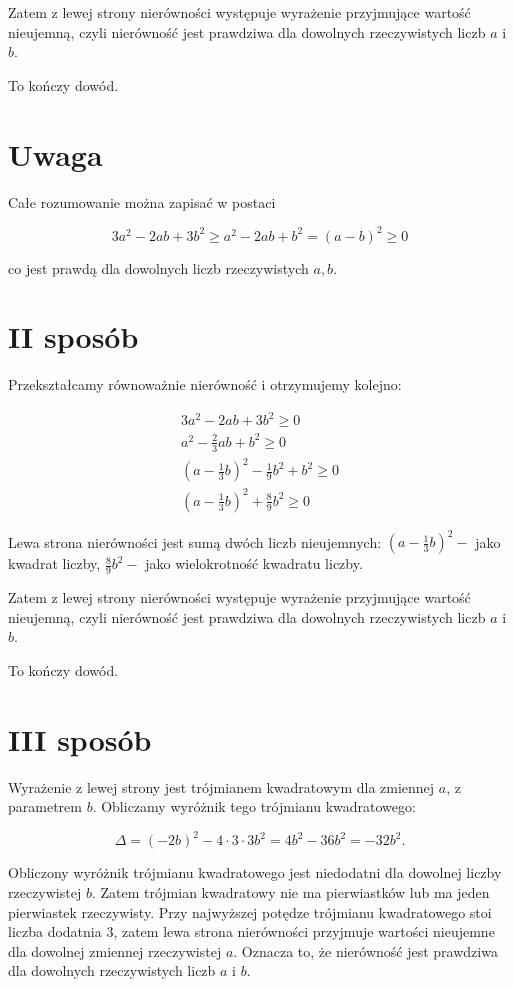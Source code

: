 \documentclass[10pt]{article}
\begin{document}
Zatem z lewej strony nierówności występuje wyrażenie przyjmujące wartość nieujemną, czyli nierówność jest prawdziwa dla dowolnych rzeczywistych liczb $a$ i $b$.

To kończy dowód.

\section*{Uwaga}
Całe rozumowanie można zapisać w postaci

$$
3 a^{2}-2 a b+3 b^{2} \geq a^{2}-2 a b+b^{2}=(a-b)^{2} \geq 0
$$

co jest prawdą dla dowolnych liczb rzeczywistych $a, b$.

\section*{II sposób}
Przekształcamy równoważnie nierówność i otrzymujemy kolejno:

$$
\begin{gathered}
3 a^{2}-2 a b+3 b^{2} \geq 0 \\
a^{2}-\frac{2}{3} a b+b^{2} \geq 0 \\
\left(a-\frac{1}{3} b\right)^{2}-\frac{1}{9} b^{2}+b^{2} \geq 0 \\
\left(a-\frac{1}{3} b\right)^{2}+\frac{8}{9} b^{2} \geq 0
\end{gathered}
$$

Lewa strona nierówności jest sumą dwóch liczb nieujemnych: $\left(a-\frac{1}{3} b\right)^{2}-$ jako kwadrat liczby, $\frac{8}{9} b^{2}-$ jako wielokrotność kwadratu liczby.

Zatem z lewej strony nierówności występuje wyrażenie przyjmujące wartość nieujemną, czyli nierówność jest prawdziwa dla dowolnych rzeczywistych liczb $a$ i $b$.

To kończy dowód.

\section*{III sposób}
Wyrażenie z lewej strony jest trójmianem kwadratowym dla zmiennej $a$, z parametrem $b$. Obliczamy wyróżnik tego trójmianu kwadratowego:

$$
\Delta=(-2 b)^{2}-4 \cdot 3 \cdot 3 b^{2}=4 b^{2}-36 b^{2}=-32 b^{2} .
$$

Obliczony wyróżnik trójmianu kwadratowego jest niedodatni dla dowolnej liczby rzeczywistej $b$. Zatem trójmian kwadratowy nie ma pierwiastków lub ma jeden pierwiastek rzeczywisty. Przy najwyższej potędze trójmianu kwadratowego stoi liczba dodatnia 3, zatem lewa strona nierówności przyjmuje wartości nieujemne dla dowolnej zmiennej rzeczywistej $a$. Oznacza to, że nierówność jest prawdziwa dla dowolnych rzeczywistych liczb $a$ i $b$.
\end{document}

